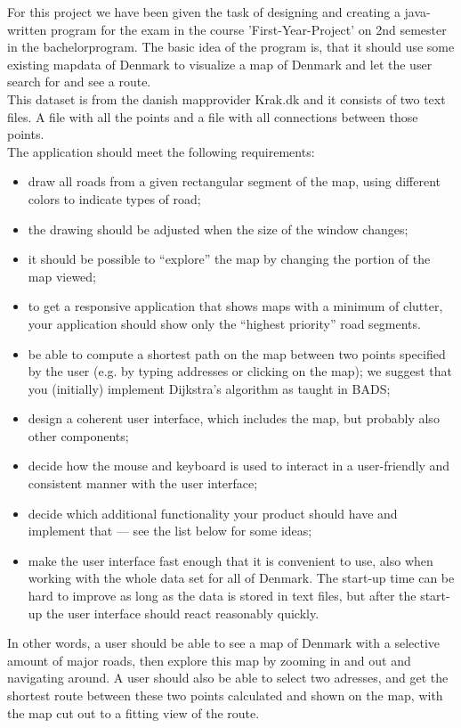 \documentclass[a4paper,10pt,titlepage]{article}
\begin{document}
		For this project we have been given the task of designing and creating a java-written program 
		for the exam in the course 'First-Year-Project' on 2nd semester in the bachelorprogram. The basic idea of the 
		program is, that it should use some existing mapdata of Denmark to visualize a map of Denmark and let the user search for and see a route. 
		\\This dataset is from the danish mapprovider Krak.dk and it consists of two text files. A file with all the points 
		and a file with all connections between those points.  
		\\The application should meet the following requirements:
		\begin{itemize}
		\item draw all roads from a given rectangular segment of the map, using different colors to indicate types of road;
\item the drawing should be adjusted when the size of the window changes;
\item it should be possible to “explore” the map by changing the portion of the map viewed;
\item to get a responsive application that shows maps with a minimum of clutter, your application should show only the “highest priority” road segments.
\item be able to compute a shortest path on the map between two points specified by the user (e.g. by typing addresses or clicking on the map); we suggest that you (initially) implement Dijkstra’s algorithm as taught in BADS;
\item design a coherent user interface, which includes the map, but probably also other components;
\item decide how the mouse and keyboard is used to interact in a user-friendly and consistent
manner with the user interface;
\item decide which additional functionality your product should have and implement that — see the list below for some ideas;
\item make the user interface fast enough that it is convenient to use, also when working with the whole data set for all of Denmark. The start-up time can be hard to improve as long as the data is stored in text files, but after the start-up the user interface should react reasonably quickly.
		\end{itemize}
		
		In other words, a user should be able to see a map of Denmark with a selective amount of major roads, then explore this map by zooming in and out and navigating around. A user should also be able to select two adresses, and get the shortest route between these two points calculated and shown on the map, with the map cut out to a fitting view of the route.
\end{document}
